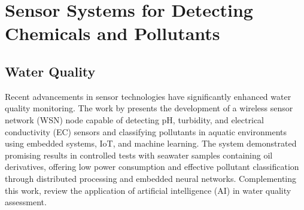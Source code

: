 \documentclass[conference]{IEEEtran}
\begin{document}



\section{Sensor Systems for Detecting Chemicals and Pollutants}

\subsection{Water Quality}

Recent advancements in sensor technologies have significantly enhanced water quality monitoring. The work by \cite{ferreira_2023_conception} presents the development of a wireless sensor network (WSN) node capable of detecting pH, turbidity, and electrical conductivity (EC) sensors and classifying pollutants in aquatic environments using embedded systems, IoT, and machine learning. The system demonstrated promising results in controlled tests with seawater samples containing oil derivatives, offering low power consumption and effective pollutant classification through distributed processing and embedded neural networks. Complementing this work, \cite{nr_2025_ai} review the application of artificial intelligence (AI) in water quality assessment.
\end{document}
